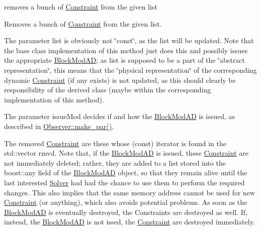 removes a bunch of \mbox{\hyperlink{class_s_m_spp__di__unipi__it_1_1_constraint}{Constraint}} from the given list 

Removes a bunch of \mbox{\hyperlink{class_s_m_spp__di__unipi__it_1_1_constraint}{Constraint}} from the given list.

The parameter list is obviously not \char`\"{}const\char`\"{}, as the list will be updated. Note that the base class implementation of this method just does this and possibly issues the appropriate \mbox{\hyperlink{class_s_m_spp__di__unipi__it_1_1_block_mod_a_d}{Block\+Mod\+AD}}; as list is supposed to be a part of the \char`\"{}abstract representation\char`\"{}, this means that the \char`\"{}physical representation\char`\"{} of the corresponding dynamic \mbox{\hyperlink{class_s_m_spp__di__unipi__it_1_1_constraint}{Constraint}} (if any exists) is not updated, as this should clearly be responsibility of the derived class (maybe within the corresponding implementation of this method).

The parameter issue\+Mod decides if and how the \mbox{\hyperlink{class_s_m_spp__di__unipi__it_1_1_block_mod_a_d}{Block\+Mod\+AD}} is issued, as described in \mbox{\hyperlink{class_s_m_spp__di__unipi__it_1_1_observer_a2d499ae38e5e95cf66cd71da32b0694a}{Observer\+::make\+\_\+par()}}.

The removed \mbox{\hyperlink{class_s_m_spp__di__unipi__it_1_1_constraint}{Constraint}} are these whose (const) iterator is found in the std\+::vector rmvd. Note that, if the \mbox{\hyperlink{class_s_m_spp__di__unipi__it_1_1_block_mod_a_d}{Block\+Mod\+AD}} is issued, these \mbox{\hyperlink{class_s_m_spp__di__unipi__it_1_1_constraint}{Constraint}} are not immediately deleted; rather, they are added to a list stored into the boost\+::any field of the \mbox{\hyperlink{class_s_m_spp__di__unipi__it_1_1_block_mod_a_d}{Block\+Mod\+AD}} object, so that they remain alive until the last interested \mbox{\hyperlink{class_s_m_spp__di__unipi__it_1_1_solver}{Solver}} had had the chance to use them to perform the required changes. This also implies that the same memory address cannot be used for new \mbox{\hyperlink{class_s_m_spp__di__unipi__it_1_1_constraint}{Constraint}} (or anything), which also avoids potential problems. As soon as the \mbox{\hyperlink{class_s_m_spp__di__unipi__it_1_1_block_mod_a_d}{Block\+Mod\+AD}} is eventually destroyed, the Constraints are destroyed as well. If, instead, the \mbox{\hyperlink{class_s_m_spp__di__unipi__it_1_1_block_mod_a_d}{Block\+Mod\+AD}} is not issed, the \mbox{\hyperlink{class_s_m_spp__di__unipi__it_1_1_constraint}{Constraint}} are destroyed immediately.

